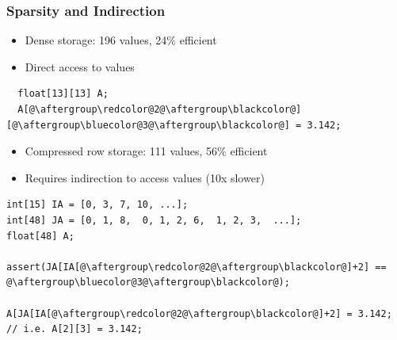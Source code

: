 \documentclass[xcolor=dvipsnames]{beamer}
\begin{document}
\begin{frame}[fragile]
  \frametitle{Sparsity and Indirection}
  \begin{itemize}
  \item Dense storage: 196 values, 24\% efficient
  \item Direct access to values
  \end{itemize}
\begin{lstlisting}
  float[13][13] A;
  A[@\aftergroup\redcolor@2@\aftergroup\blackcolor@][@\aftergroup\bluecolor@3@\aftergroup\blackcolor@] = 3.142;
\end{lstlisting}
\vspace{5mm}
  \begin{itemize}
  \item Compressed row storage: 111 values, 56\% efficient
  \item Requires indirection to access values (10x slower)
  \end{itemize}
\begin{lstlisting}
int[15] IA = [0, 3, 7, 10, ...];
int[48] JA = [0, 1, 8,  0, 1, 2, 6,  1, 2, 3,  ...];
float[48] A;

assert(JA[IA[@\aftergroup\redcolor@2@\aftergroup\blackcolor@]+2] == @\aftergroup\bluecolor@3@\aftergroup\blackcolor@);

A[JA[IA[@\aftergroup\redcolor@2@\aftergroup\blackcolor@]+2] = 3.142; // i.e. A[2][3] = 3.142;
\end{lstlisting}
\end{frame}
\end{document}
